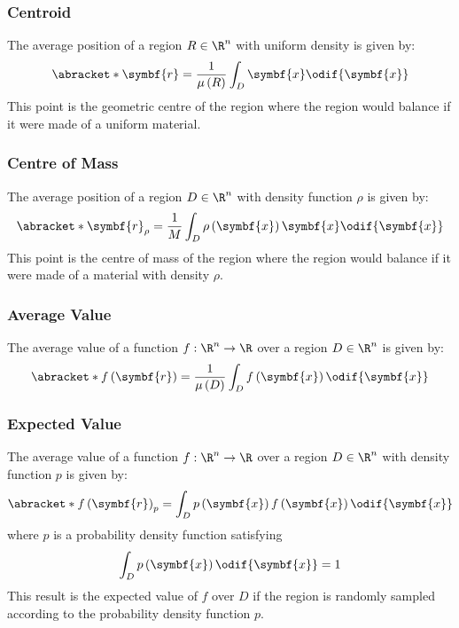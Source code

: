 \documentclass{article}
\begin{document}
\subsubsection*{Centroid}
The average position of a region \(R \in \R^n\) with uniform density is
given by:
\begin{equation*}
    \abracket*{\symbf{r}} = \frac{1}{\mu\left( R \right)} \int_D \symbf{x} \odif{\symbf{x}}
\end{equation*}
This point is the geometric centre of the region where the region would
balance if it were made of a uniform material.
\subsubsection*{Centre of Mass}
The average position of a region \(D \in \R^n\) with density function
\(\rho\) is given by:
\begin{equation*}
    \abracket*{\symbf{r}}_\rho = \frac{1}{M} \int_D \rho\left( \symbf{x} \right) \symbf{x} \odif{\symbf{x}}
\end{equation*}
This point is the centre of mass of the region where the region would
balance if it were made of a material with density \(\rho\).
\subsubsection*{Average Value}
The average value of a function \(f : \R^n \to \R\) over a region \(D
\in \R^n\) is given by:
\begin{equation*}
    \abracket*{f\left( \symbf{r} \right)} = \frac{1}{\mu\left( D \right)} \int_D f\left( \symbf{x} \right) \odif{\symbf{x}}
\end{equation*}
\subsubsection*{Expected Value}
The average value of a function \(f : \R^n \to \R\) over a region \(D
\in \R^n\) with density function \(p\) is given by:
\begin{equation*}
    \abracket*{f\left( \symbf{r} \right)}_p = \int_D p\left( \symbf{x} \right) f\left( \symbf{x} \right) \odif{\symbf{x}}
\end{equation*}
where \(p\) is a probability density function satisfying
\begin{equation*}
    \int_D p\left( \symbf{x} \right) \odif{\symbf{x}} = 1
\end{equation*}
This result is the expected value of \(f\) over \(D\) if the region
is randomly sampled according to the probability density function \(p\).
\end{document}
